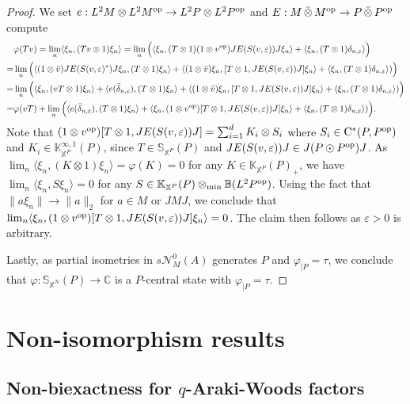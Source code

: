 \documentclass[a4paper,11pt]{amsart}
\theoremstyle{definition}
\newcommand{\B}{{\mathbb B}}
\newcommand{\C}{{\mathbb C}}
\newcommand{\K}{{\mathbb K}}
\newcommand{\bS}{{\mathbb S}}
\newcommand{\X}{{\mathbb X}}
\newcommand{\cN}{{\mathcal N}}
\newcommand{\ot}{\otimes}
\newcommand{\ovt}{\, \bar{\otimes}\,}
\newcommand{\op}{{\rm op}}
\begin{document}
\begin{proof}
We set $e: L^2M\ot L^2M^\op \to L^2P\ot L^2P^{\op}$ and $E: M\ovt M^{\op}\to P\ovt P^\op$ compute
\[\begin{aligned} 
&\varphi(Tv)=\lim_{n} \langle \xi_n, (Tv\ot 1)\xi_n\rangle
	=\lim_{n}\Big(\langle \xi_n, (T\ot 1)(1\ot v^\op) JE(S(v,\varepsilon))J \xi_n\rangle+ \langle \xi_n, (T\ot 1)\delta_{n,\varepsilon}\rangle\Big)\\
=& \lim_{n} \Big( \langle (1\ot \bar v)JE(S(v,\varepsilon)^*)J \xi_n,(T\ot 1)\xi_n\rangle+\langle (1\ot \bar v)\xi_n, [T\ot 1, JE(S(v,\varepsilon))J]\xi_n\rangle
	+ \langle \xi_n, (T\ot 1)\delta_{n,\varepsilon}\rangle)\Big)\\
=& \lim_{n} \Big(\langle\xi_n, (vT\ot 1)\xi_n\rangle+ \langle e(\bar\delta_{n,\varepsilon}), (T\ot 1)\xi_n\rangle+
	\langle (1\ot \bar v)\xi_n, [T\ot 1, JE(S(v,\varepsilon))J]\xi_n\rangle
	+ \langle \xi_n, (T\ot 1)\delta_{n,\varepsilon}\rangle)\Big)\\
=& \varphi(vT) +\lim_n \Big( \langle e(\bar\delta_{n,\varepsilon}), (T\ot 1)\xi_n\rangle+ \langle \xi_n, (1\ot v^\op) [T\ot 1, JE(S(v,\varepsilon))J]\xi_n\rangle
	+ \langle \xi_n, (T\ot 1)\delta_{n,\varepsilon}\rangle)\Big).
\end{aligned}\]
Note that $(1\ot v^\op)[T\ot 1, JE(S(v,\varepsilon))J]=\sum_{i=1}^d K_i\ot S_i$
	where $S_i\in {\rm C}^*(P, P^\op)$ and $K_i\in \K^{\infty,1}_{\X^P}(P)$,
	since $T\in \bS_{\X^P}(P)$ and $JE(S(v,\varepsilon))J\in J(P\odot P^\op )J$.
As $\lim_{n}\langle \xi_n, (K\ot 1)\xi_n\rangle=\varphi(K)=0$
	for any $K\in \K_{\X^P}(P)_+$,
	we have $\lim_n\langle\xi_n, S\xi_n\rangle=0$ for any $S\in \K_{\X^P}(P)\otimes_{\rm min} \B(L^2P^\op)$.
Using the fact that $\|a\xi_n\|\to \|a\|_2$ for $a\in M$ or $JMJ$,
	we conclude that $\lim_n\langle \xi_n, (1\ot v^\op) [T\ot 1, JE(S(v,\varepsilon))J]\xi_n\rangle=0$.
The claim then follows as $\varepsilon>0$ is arbitrary.

Lastly, as partial isometries in $s\cN_M^0 (A)$ generates $P$ and $\varphi_{\mid P}=\tau$,
	we conclude that $\varphi:\bS_{\X^N}(P)\to \C$ is a $P$-central state with $\varphi_{\mid P}=\tau$.
\end{proof}




\section{Non-isomorphism results}\label{sec: iso}


\subsection{Non-biexactness for $q$-Araki-Woods factors}
\end{document}
